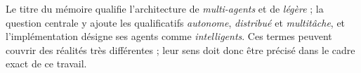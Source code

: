 
Le titre du mémoire qualifie l'architecture de \textit{multi-agents} et de \textit{légère} ; la question centrale y ajoute les qualificatifs \textit{autonome}, \textit{distribué} et \textit{multitâche}, et l'implémentation désigne ses agents comme \textit{intelligents}. Ces termes peuvent couvrir des réalités très différentes ; leur sens doit donc être précisé dans le cadre exact de ce travail.
